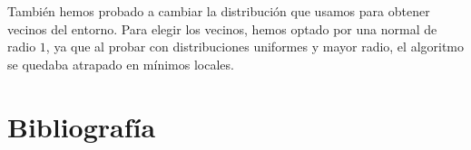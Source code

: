 \documentclass[a4paper,12pt]{article}
\begin{document}
	También hemos probado a cambiar la distribución que usamos para obtener vecinos del entorno. Para elegir los vecinos, hemos optado por una normal de radio $1$, ya que al probar con distribuciones uniformes y mayor radio, el algoritmo se quedaba atrapado en mínimos locales.
	
	\section*{Bibliografía}
	
	
	
\end{document}
